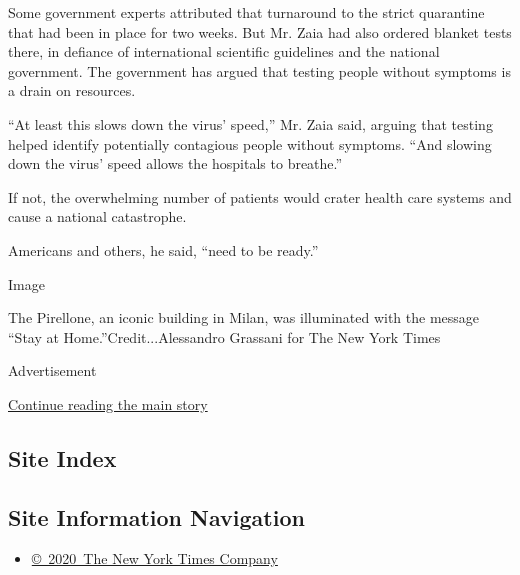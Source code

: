 Some government experts attributed that turnaround to the strict
quarantine that had been in place for two weeks. But Mr. Zaia had also
ordered blanket tests there, in defiance of international scientific
guidelines and the national government. The government has argued that
testing people without symptoms is a drain on resources.

``At least this slows down the virus' speed,'' Mr. Zaia said, arguing
that testing helped identify potentially contagious people without
symptoms. ``And slowing down the virus' speed allows the hospitals to
breathe.''

If not, the overwhelming number of patients would crater health care
systems and cause a national catastrophe.

Americans and others, he said, ``need to be ready.''

Image

The Pirellone, an iconic building in Milan, was illuminated with the
message ``Stay at Home.''Credit...Alessandro Grassani for The New York
Times

Advertisement

\protect\hyperlink{after-bottom}{Continue reading the main story}

\hypertarget{site-index}{%
\subsection{Site Index}\label{site-index}}

\hypertarget{site-information-navigation}{%
\subsection{Site Information
Navigation}\label{site-information-navigation}}

\begin{itemize}
\tightlist
\item
  \href{https://help.nytimes3xbfgragh.onion/hc/en-us/articles/115014792127-Copyright-notice}{©~2020~The
  New York Times Company}
\end{itemize}

